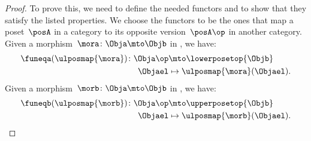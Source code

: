 \begin{proof}
To prove this, we need to define the needed functors and to show that they satisfy the listed properties.
We choose the functors to be the ones that map a poset~$\posA$ in a category to its opposite version~$\posA\op$ in another category.
Given a morphism~$\mora\colon \Obja \mto \Objb$ in \UPos, we have:
\begin{equation*}
    \begin{aligned}
    \funeqa(\ulposmap{\mora})\colon \Obja\op &\mto \lowerposetop{\Objb}\\
    \Objael&\mapsto \ulposmap{\mora}(\Objael).
    \end{aligned}
\end{equation*}
Given a morphism~$\morb\colon \Obja \mto \Objb$ in \LPos, we have:
\begin{equation*}
    \begin{aligned}
    \funeqb(\ulposmap{\morb})\colon \Obja\op &\mto \upperposetop{\Objb}\\
    \Objael&\mapsto \ulposmap{\morb}(\Objael).
    \end{aligned}
\end{equation*}

\end{proof}
